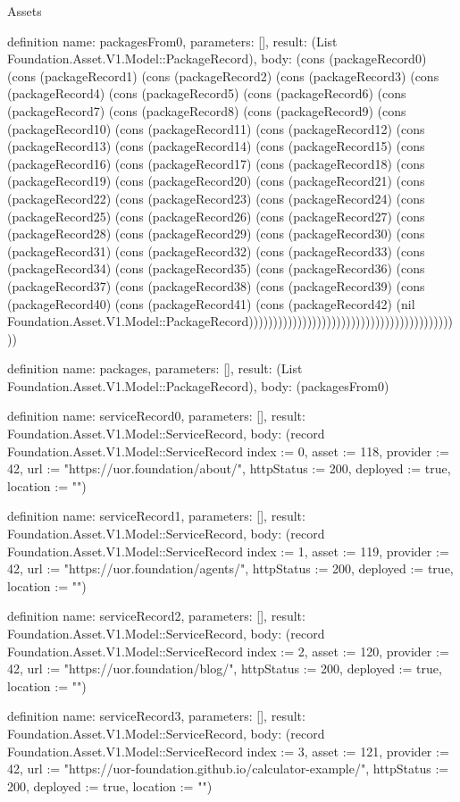 \begin{lexlean}{Assets}
\begin{semanticmodule}
definition{
  name: packagesFrom0,
  parameters: [],
  result: (List Foundation.Asset.V1.Model::PackageRecord),
  body: (cons (packageRecord0) (cons (packageRecord1) (cons (packageRecord2) (cons (packageRecord3) (cons (packageRecord4) (cons (packageRecord5) (cons (packageRecord6) (cons (packageRecord7) (cons (packageRecord8) (cons (packageRecord9) (cons (packageRecord10) (cons (packageRecord11) (cons (packageRecord12) (cons (packageRecord13) (cons (packageRecord14) (cons (packageRecord15) (cons (packageRecord16) (cons (packageRecord17) (cons (packageRecord18) (cons (packageRecord19) (cons (packageRecord20) (cons (packageRecord21) (cons (packageRecord22) (cons (packageRecord23) (cons (packageRecord24) (cons (packageRecord25) (cons (packageRecord26) (cons (packageRecord27) (cons (packageRecord28) (cons (packageRecord29) (cons (packageRecord30) (cons (packageRecord31) (cons (packageRecord32) (cons (packageRecord33) (cons (packageRecord34) (cons (packageRecord35) (cons (packageRecord36) (cons (packageRecord37) (cons (packageRecord38) (cons (packageRecord39) (cons (packageRecord40) (cons (packageRecord41) (cons (packageRecord42) (nil Foundation.Asset.V1.Model::PackageRecord))))))))))))))))))))))))))))))))))))))))))))
}

definition{
  name: packages,
  parameters: [],
  result: (List Foundation.Asset.V1.Model::PackageRecord),
  body: (packagesFrom0)
}

definition{
  name: serviceRecord0,
  parameters: [],
  result: Foundation.Asset.V1.Model::ServiceRecord,
  body: (record Foundation.Asset.V1.Model::ServiceRecord {index := 0, asset := 118, provider := 42, url := "https://uor.foundation/about/", httpStatus := 200, deployed := true, location := ""})
}

definition{
  name: serviceRecord1,
  parameters: [],
  result: Foundation.Asset.V1.Model::ServiceRecord,
  body: (record Foundation.Asset.V1.Model::ServiceRecord {index := 1, asset := 119, provider := 42, url := "https://uor.foundation/agents/", httpStatus := 200, deployed := true, location := ""})
}

definition{
  name: serviceRecord2,
  parameters: [],
  result: Foundation.Asset.V1.Model::ServiceRecord,
  body: (record Foundation.Asset.V1.Model::ServiceRecord {index := 2, asset := 120, provider := 42, url := "https://uor.foundation/blog/", httpStatus := 200, deployed := true, location := ""})
}

definition{
  name: serviceRecord3,
  parameters: [],
  result: Foundation.Asset.V1.Model::ServiceRecord,
  body: (record Foundation.Asset.V1.Model::ServiceRecord {index := 3, asset := 121, provider := 42, url := "https://uor-foundation.github.io/calculator-example/", httpStatus := 200, deployed := true, location := ""})
}


\end{semanticmodule}
\end{lexlean}
